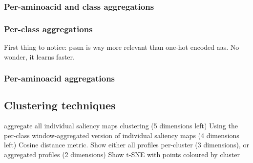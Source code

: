 		\subsubsection{Per-aminoacid and class aggregations}
		
		\subsubsection{Per-class aggregations}
		First thing to notice: pssm is way more relevant than one-hot encoded aas. No wonder, it learns faster.

		\subsubsection{Per-aminoacid aggregations}

	\subsection{Clustering techniques}
	aggregate all individual saliency maps %
	clustering (5 dimensions left)
	Using the per-class window-aggregated version of individual saliency maps (4 dimensions left)
	Cosine distance metric.
	Show either all profiles per-cluster (3 dimensions), or aggregated profiles (2 dimensions)
	Show t-SNE with points coloured by cluster
